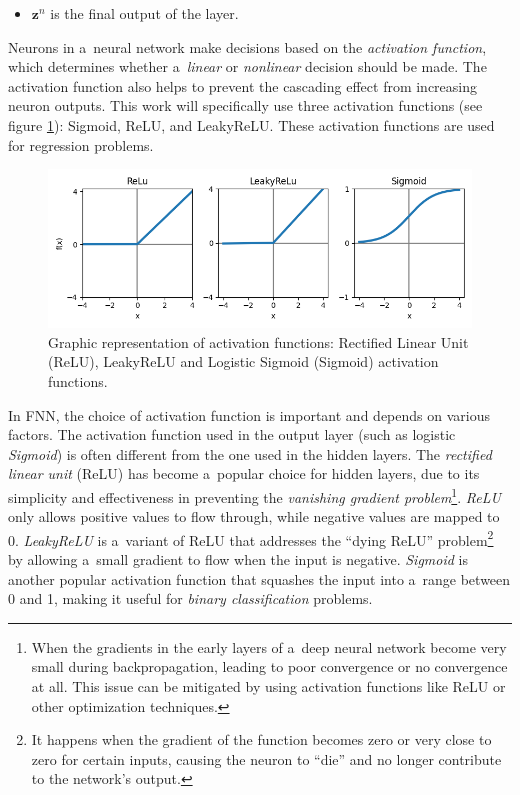 \begin{itemize}
    \item $\mathbf{z}^n$ is the final output of the layer.
\end{itemize}

Neurons in a~neural network make decisions based on the \textit{activation function}, which determines whether a~\textit{linear} or \textit{nonlinear} decision should be made. The activation function also helps to prevent the cascading effect from increasing neuron outputs. This work will specifically use three activation functions (see figure \ref{fig:activ}): Sigmoid, ReLU, and LeakyReLU. These activation functions are used for regression problems.

    \begin{figure}[ht!]
        \centering
        \includegraphics[width = \textwidth]{obrazky-figures/active.png}
        \caption{Graphic representation of activation functions: Rectified Linear Unit (ReLU), LeakyReLU and  Logistic Sigmoid (Sigmoid) activation functions.}
        \label{fig:activ}
    \end{figure}

\newpage

In FNN, the choice of activation function is important and depends on various factors. The activation function used in the output layer (such as logistic \textit{Sigmoid}) is often different from the one used in the hidden layers. The \textit{rectified linear unit} (ReLU) has become a~popular choice for hidden layers, due to its simplicity and effectiveness in preventing the \textit{vanishing gradient problem}\footnote{When the gradients in the early layers of a~deep neural network become very small during backpropagation, leading to poor convergence or no convergence at all. This issue can be mitigated by using activation functions like ReLU or other optimization techniques.}. \textit{ReLU} only allows positive values to flow through, while negative values are mapped to 0. \textit{LeakyReLU} is a~variant of ReLU that addresses the ``dying ReLU'' problem\footnote{It happens when the gradient of the function becomes zero or very close to zero for certain inputs, causing the neuron to ``die'' and no longer contribute to the network's output.} by allowing a~small gradient to flow when the input is negative. \textit{Sigmoid} is another popular activation function that squashes the input into a~range between 0 and 1, making it useful for \textit{binary classification} problems. 

